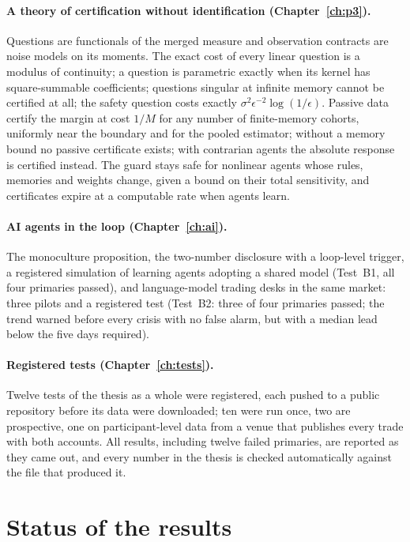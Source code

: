 \paragraph{A theory of certification without identification (Chapter~\ref{ch:p3}).} Questions are functionals of the merged measure and observation contracts are noise models on its moments. The exact cost of every linear question is a modulus of continuity; a question is parametric exactly when its kernel has square-summable coefficients; questions singular at infinite memory cannot be certified at all; the safety question costs exactly $\sigma^2\epsilon^{-2}\log(1/\epsilon)$. Passive data certify the margin at cost $1/M$ for any number of finite-memory cohorts, uniformly near the boundary and for the pooled estimator; without a memory bound no passive certificate exists; with contrarian agents the absolute response is certified instead. The guard stays safe for nonlinear agents whose rules, memories and weights change, given a bound on their total sensitivity, and certificates expire at a computable rate when agents learn.

\paragraph{AI agents in the loop (Chapter~\ref{ch:ai}).} The monoculture proposition, the two-number disclosure with a loop-level trigger, a registered simulation of learning agents adopting a shared model (Test~B1, all four primaries passed), and language-model trading desks in the same market: three pilots and a registered test (Test~B2: three of four primaries passed; the trend warned before every crisis with no false alarm, but with a median lead below the five days required).

\paragraph{Registered tests (Chapter~\ref{ch:tests}).} Twelve tests of the thesis as a whole were registered, each pushed to a public repository before its data were downloaded; ten were run once, two are prospective, one on participant-level data from a venue that publishes every trade with both accounts. All results, including twelve failed primaries, are reported as they came out, and every number in the thesis is checked automatically against the file that produced it.

\section{Status of the results}

